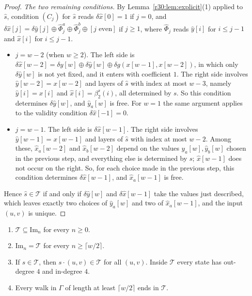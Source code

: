 \begin{proof}
\emph{The two remaining conditions.} By Lemma~\ref{r30:lem:explicit}(1) applied to $\hat s$, condition $(C_j)$ for $\hat s$ reads $\delta\hat x[0]=1$ if $j=0$, and $\delta\hat x[j]=\delta\hat y[j]\oplus\hat\Phi^a_j\oplus\hat\Phi^b_j\oplus[j\text{ even}]$ if $j\ge1$, where $\hat\Phi_j$ reads $\hat y[i]$ for $i\le j-1$ and $\hat x[i]$ for $i\le j-1$.
\begin{itemize}
\item $j=w-2$ (when $w\ge2$). The left side is $\delta\hat x[w-2]=\delta y[w]\oplus\delta\hat y[w]\oplus\delta g(x[w-1],x[w-2])$, in which only $\delta\hat y[w]$ is not yet fixed, and it enters with coefficient $1$. The right side involves $\hat y[w-2]=x[w-2]$ and layers of $\hat s$ with index at most $w-3$, namely $\hat y[i]=x[i]$ and $\hat x[i]=\beta^s_2(i)$, all determined by $s$. So this condition determines $\delta\hat y[w]$, and $\hat y_a[w]$ is free. For $w=1$ the same argument applies to the validity condition $\delta\hat x[-1]=0$.
\item $j=w-1$. The left side is $\delta\hat x[w-1]$. The right side involves $\hat y[w-1]=x[w-1]$ and layers of $\hat s$ with index at most $w-2$. Among these, $\hat x_a[w-2]$ and $\hat x_b[w-2]$ depend on the values $\hat y_a[w],\hat y_b[w]$ chosen in the previous step, and everything else is determined by $s$; $\hat x[w-1]$ does not occur on the right. So, for each choice made in the previous step, this condition determines $\delta\hat x[w-1]$, and $\hat x_a[w-1]$ is free.
\end{itemize}
Hence $\hat s\in\mathcal{T}$ if and only if $\delta\hat y[w]$ and $\delta\hat x[w-1]$ take the values just described, which leaves exactly two choices of $\hat y_a[w]$ and two of $\hat x_a[w-1]$, and the input $(u,v)$ is unique.
\end{proof}

\begin{proposition}\label{r30:prop:closure}
\begin{enumerate}
\item $\mathcal{T}\subseteq\mathrm{Im}_n$ for every $n\ge0$.
\item $\mathrm{Im}_n=\mathcal{T}$ for every $n\ge\lceil w/2\rceil$.
\item If $s\in\mathcal{T}$, then $s\cdot(u,v)\in\mathcal{T}$ for all $(u,v)$. Inside $\mathcal{T}$ every state has out-degree $4$ and in-degree $4$.
\item Every walk in $\Gamma$ of length at least $\lceil w/2\rceil$ ends in $\mathcal{T}$.
\end{enumerate}
\end{proposition}

